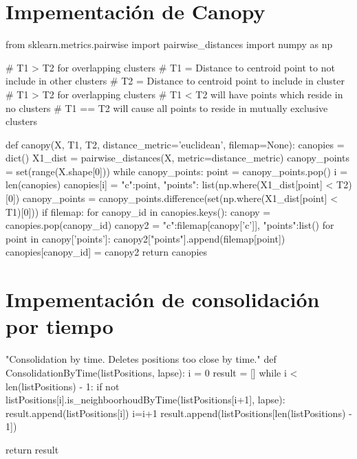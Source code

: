 \documentclass[a4paper, 12pt]{article}
\begin{document}
\newpage
\section{Impementaci\'on de Canopy} \label{App:AppendixD}

\begin{python}
from sklearn.metrics.pairwise import pairwise_distances
import numpy as np

# T1 > T2 for overlapping clusters
# T1 = Distance to centroid point to not include in other clusters
# T2 = Distance to centroid point to include in cluster
# T1 > T2 for overlapping clusters
# T1 < T2 will have points which reside in no clusters
# T1 == T2 will cause all points to reside in mutually exclusive clusters

def canopy(X, T1, T2, distance_metric='euclidean', filemap=None):
    canopies = dict()
    X1_dist = pairwise_distances(X, metric=distance_metric)
    canopy_points = set(range(X.shape[0]))
    while canopy_points:
        point = canopy_points.pop()
        i = len(canopies)
        canopies[i] = {"c":point, "points": list(np.where(X1_dist[point] < T2)[0])}
        canopy_points = canopy_points.difference(set(np.where(X1_dist[point] < T1)[0]))
    if filemap:
        for canopy_id in canopies.keys():
            canopy = canopies.pop(canopy_id)
            canopy2 = {"c":filemap[canopy['c']], "points":list()}
            for point in canopy['points']:
                canopy2["points"].append(filemap[point])
            canopies[canopy_id] = canopy2
    return canopies

\end{python}

\newpage
\section{Impementaci\'on de consolidaci\'on por tiempo} \label{App:AppendixF}

\begin{python}
"Consolidation by time. Deletes positions too close by time."
def ConsolidationByTime(listPositions, lapse):
	i = 0
	result = []
	while i < len(listPositions) - 1:
		if not listPositions[i].is_neighboorhoudByTime(listPositions[i+1], lapse):
			result.append(listPositions[i])
		i=i+1
	result.append(listPositions[len(listPositions) - 1])

	return result
\end{python}


\end{document}
